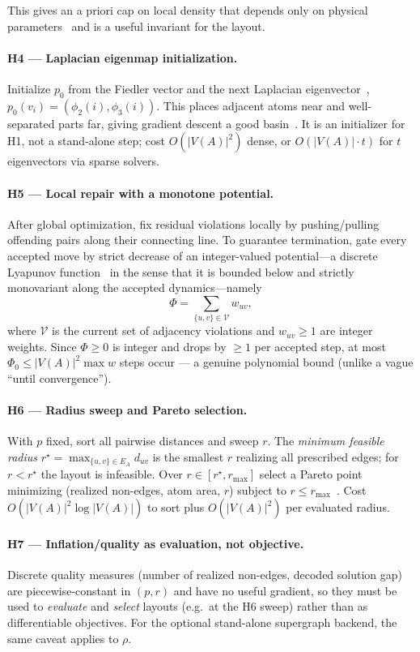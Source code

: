 \documentclass[11pt]{article}
\theoremstyle{definition}
\theoremstyle{remark}
\begin{document}
\noindent This gives an a priori cap on local density that depends only on physical
parameters~\cite{Henriet2021,Scholl2022} and is a useful invariant for the layout.

\paragraph{H4 --- Laplacian eigenmap initialization.} Initialize $p_0$ from the
Fiedler vector and the next Laplacian eigenvector~\cite{Fiedler1973,Chung1997,Belkin2003},
$p_0(v_i)=(\phi_2(i),\phi_3(i))$. This places adjacent atoms near and well-separated
parts far, giving gradient descent a good basin~\cite{Fruchterman1991}. It is an
initializer for H1, not a stand-alone step; cost $O(|V(A)|^2)$ dense, or
$O(|V(A)|\cdot t)$ for $t$ eigenvectors via sparse solvers.

\paragraph{H5 --- Local repair with a monotone potential.} After global
optimization, fix residual violations locally by pushing/pulling offending pairs
along their connecting line. To guarantee termination, gate every accepted move by
strict decrease of an integer-valued potential---a discrete Lyapunov
function~\cite{Lyapunov1907} in the sense that it is bounded below and strictly
monovariant along the accepted dynamics---namely
\[
  \Phi = \sum_{\{u,v\}\in \mathcal{V}} w_{uv},
\]
where $\mathcal{V}$ is the current set of adjacency violations and $w_{uv}\ge 1$
are integer weights. Since $\Phi\ge 0$ is integer and drops by $\ge 1$ per accepted
step, at most $\Phi_0\le |V(A)|^2\max w$ steps occur --- a genuine polynomial bound
(unlike a vague ``until convergence'').

\paragraph{H6 --- Radius sweep and Pareto selection.} With $p$ fixed, sort all
pairwise distances and sweep $r$. The \emph{minimum feasible radius}
$r^\star=\max_{\{u,v\}\in E_A}d_{uv}$ is the smallest $r$ realizing all prescribed
edges; for $r<r^\star$ the layout is infeasible. Over $r\in[r^\star,r_{\max}]$
select a Pareto point minimizing (realized non-edges, atom area, $r$) subject to
$r\le r_{\max}$~\cite{Miettinen2014}. Cost $O(|V(A)|^2\log|V(A)|)$ to sort plus
$O(|V(A)|^2)$ per evaluated radius.

\paragraph{H7 --- Inflation/quality as evaluation, not objective.} Discrete
quality measures (number of realized non-edges, decoded solution gap) are
piecewise-constant in $(p,r)$ and have no useful gradient, so they must be used to
\emph{evaluate} and \emph{select} layouts (e.g.\ at the H6 sweep) rather than as
differentiable objectives. For the optional stand-alone supergraph backend, the
same caveat applies to $\rho$.
\end{document}
